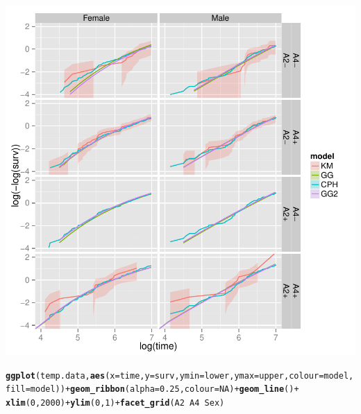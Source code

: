 \documentclass{article}\usepackage[]{graphicx}\usepackage[]{color}
\makeatletter
\def\maxwidth{ %
  \ifdim\Gin@nat@width>\linewidth
    \linewidth
  \else
    \Gin@nat@width
  \fi
}
\newcommand{\hlnum}[1]{\textcolor[rgb]{0.686,0.059,0.569}{#1}}%
\newcommand{\hlopt}[1]{\textcolor[rgb]{0,0,0}{#1}}%
\newcommand{\hlstd}[1]{\textcolor[rgb]{0.345,0.345,0.345}{#1}}%
\newcommand{\hlkwc}[1]{\textcolor[rgb]{0.333,0.667,0.333}{#1}}%
\newcommand{\hlkwd}[1]{\textcolor[rgb]{0.737,0.353,0.396}{\textbf{#1}}}%
\newenvironment{kframe}{%
 \def\at@end@of@kframe{}%
 \ifinner\ifhmode%
  \def\at@end@of@kframe{\end{minipage}}%
  \begin{minipage}{\columnwidth}%
 \fi\fi%
 \def\FrameCommand##1{\hskip\@totalleftmargin \hskip-\fboxsep
 \colorbox{shadecolor}{##1}\hskip-\fboxsep
     \hskip-\linewidth \hskip-\@totalleftmargin \hskip\columnwidth}%
 \MakeFramed {\advance\hsize-\width
   \@totalleftmargin\z@ \linewidth\hsize
   \@setminipage}}%
 {\par\unskip\endMakeFramed%
 \at@end@of@kframe}
\newenvironment{knitrout}{}{} %
\makeatother
\begin{document}
\begin{knitrout}
{\centering \includegraphics[width=\maxwidth]{figure/final-fit-assessment-3-1} 

}


\begin{kframe}\begin{alltt}
\hlkwd{ggplot}\hlstd{(temp.data,} \hlkwd{aes}\hlstd{(}\hlkwc{x} \hlstd{= time,} \hlkwc{y} \hlstd{= surv,} \hlkwc{ymin} \hlstd{= lower,} \hlkwc{ymax} \hlstd{= upper,} \hlkwc{colour} \hlstd{= model,}
    \hlkwc{fill} \hlstd{= model))} \hlopt{+} \hlkwd{geom_ribbon}\hlstd{(}\hlkwc{alpha} \hlstd{=} \hlnum{0.25}\hlstd{,} \hlkwc{colour} \hlstd{=} \hlnum{NA}\hlstd{)} \hlopt{+} \hlkwd{geom_line}\hlstd{()} \hlopt{+}
    \hlkwd{xlim}\hlstd{(}\hlnum{0}\hlstd{,} \hlnum{2000}\hlstd{)} \hlopt{+} \hlkwd{ylim}\hlstd{(}\hlnum{0}\hlstd{,} \hlnum{1}\hlstd{)} \hlopt{+} \hlkwd{facet_grid}\hlstd{(A2} \hlopt{~} \hlstd{A4} \hlopt{~} \hlstd{Sex)}
\end{alltt}


{\ttfamily\noindent\color{warningcolor}{\#\# Warning: Removed 3 rows containing missing values (geom\_path).}}

{\ttfamily\noindent\color{warningcolor}{\#\# Warning: Removed 3 rows containing missing values (geom\_path).}}

{\ttfamily\noindent\color{warningcolor}{\#\# Warning: Removed 2 rows containing missing values (geom\_path).}}


\end{kframe}
\end{knitrout}
\end{document}

